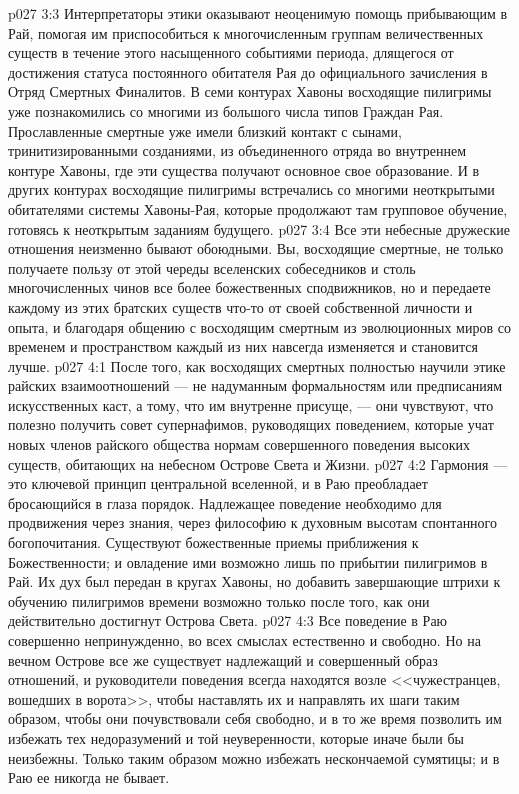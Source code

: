 \vs p027 3:3 Интерпретаторы этики оказывают неоценимую помощь прибывающим в Рай, помогая им приспособиться к многочисленным группам величественных существ в течение этого насыщенного событиями периода, длящегося от достижения статуса постоянного обитателя Рая до официального зачисления в Отряд Смертных Финалитов. В семи контурах Хавоны восходящие пилигримы уже познакомились со многими из большого числа типов Граждан Рая. Прославленные смертные уже имели близкий контакт с сынами, тринитизированными созданиями, из объединенного отряда во внутреннем контуре Хавоны, где эти существа получают основное свое образование. И в других контурах восходящие пилигримы встречались со многими неоткрытыми обитателями системы Хавоны\hyp{}Рая, которые продолжают там групповое обучение, готовясь к неоткрытым заданиям будущего.
\vs p027 3:4 Все эти небесные дружеские отношения неизменно бывают обоюдными. Вы, восходящие смертные, не только получаете пользу от этой череды вселенских собеседников и столь многочисленных чинов все более божественных сподвижников, но и передаете каждому из этих братских существ что\hyp{}то от своей собственной личности и опыта, и благодаря общению с восходящим смертным из эволюционных миров со временем и пространством каждый из них навсегда изменяется и становится лучше.
\vs p027 4:1 После того, как восходящих смертных полностью научили этике райских взаимоотношений --- не надуманным формальностям или предписаниям искусственных каст, а тому, что им внутренне присуще, --- они чувствуют, что полезно получить совет супернафимов, руководящих поведением, которые учат новых членов райского общества нормам совершенного поведения высоких существ, обитающих на небесном Острове Света и Жизни.
\vs p027 4:2 Гармония --- это ключевой принцип центральной вселенной, и в Раю преобладает бросающийся в глаза порядок. Надлежащее поведение необходимо для продвижения через знания, через философию к духовным высотам спонтанного богопочитания. Существуют божественные приемы приближения к Божественности; и овладение ими возможно лишь по прибытии пилигримов в Рай. Их дух был передан в кругах Хавоны, но добавить завершающие штрихи к обучению пилигримов времени возможно только после того, как они действительно достигнут Острова Света.
\vs p027 4:3 Все поведение в Раю совершенно непринужденно, во всех смыслах естественно и свободно. Но на вечном Острове все же существует надлежащий и совершенный образ отношений, и руководители поведения всегда находятся возле <<чужестранцев, вошедших в ворота>>, чтобы наставлять их и направлять их шаги таким образом, чтобы они почувствовали себя свободно, и в то же время позволить им избежать тех недоразумений и той неуверенности, которые иначе были бы неизбежны. Только таким образом можно избежать нескончаемой сумятицы; и в Раю ее никогда не бывает.
